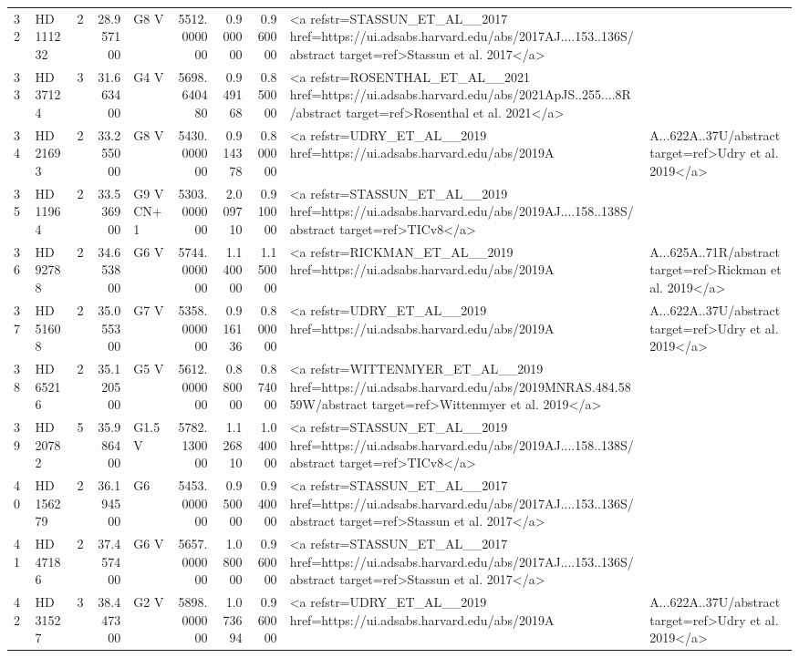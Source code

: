 \begin{tabular}{llrrlrrrl}
32 & HD 111232 & 2 & 28.957100 & G8 V & 5512.000000 & 0.900000 & 0.960000 & <a refstr=STASSUN_ET_AL__2017 href=https://ui.adsabs.harvard.edu/abs/2017AJ....153..136S/abstract target=ref>Stassun et al. 2017</a> \\
33 & HD 37124 & 3 & 31.663400 & G4 V & 5698.640480 & 0.949168 & 0.850000 & <a refstr=ROSENTHAL_ET_AL__2021 href=https://ui.adsabs.harvard.edu/abs/2021ApJS..255....8R/abstract target=ref>Rosenthal et al. 2021</a> \\
34 & HD 21693 & 2 & 33.255000 & G8 V & 5430.000000 & 0.914378 & 0.800000 & <a refstr=UDRY_ET_AL__2019 href=https://ui.adsabs.harvard.edu/abs/2019A&A...622A..37U/abstract target=ref>Udry et al. 2019</a> \\
35 & HD 11964 & 2 & 33.536900 & G9 V CN+1 & 5303.000000 & 2.009710 & 0.910000 & <a refstr=STASSUN_ET_AL__2019 href=https://ui.adsabs.harvard.edu/abs/2019AJ....158..138S/abstract target=ref>TICv8</a> \\
36 & HD 92788 & 2 & 34.653800 & G6 V & 5744.000000 & 1.140000 & 1.150000 & <a refstr=RICKMAN_ET_AL__2019 href=https://ui.adsabs.harvard.edu/abs/2019A&A...625A..71R/abstract target=ref>Rickman et al. 2019</a> \\
37 & HD 51608 & 2 & 35.055300 & G7 V & 5358.000000 & 0.916136 & 0.800000 & <a refstr=UDRY_ET_AL__2019 href=https://ui.adsabs.harvard.edu/abs/2019A&A...622A..37U/abstract target=ref>Udry et al. 2019</a> \\
38 & HD 65216 & 2 & 35.120500 & G5 V & 5612.000000 & 0.880000 & 0.874000 & <a refstr=WITTENMYER_ET_AL__2019 href=https://ui.adsabs.harvard.edu/abs/2019MNRAS.484.5859W/abstract target=ref>Wittenmyer et al. 2019</a> \\
39 & HD 20782 & 5 & 35.986400 & G1.5 V & 5782.130000 & 1.126810 & 1.040000 & <a refstr=STASSUN_ET_AL__2019 href=https://ui.adsabs.harvard.edu/abs/2019AJ....158..138S/abstract target=ref>TICv8</a> \\
40 & HD 156279 & 2 & 36.194500 & G6 & 5453.000000 & 0.950000 & 0.940000 & <a refstr=STASSUN_ET_AL__2017 href=https://ui.adsabs.harvard.edu/abs/2017AJ....153..136S/abstract target=ref>Stassun et al. 2017</a> \\
41 & HD 47186 & 2 & 37.457400 & G6 V & 5657.000000 & 1.080000 & 0.960000 & <a refstr=STASSUN_ET_AL__2017 href=https://ui.adsabs.harvard.edu/abs/2017AJ....153..136S/abstract target=ref>Stassun et al. 2017</a> \\
42 & HD 31527 & 3 & 38.447300 & G2 V & 5898.000000 & 1.073694 & 0.960000 & <a refstr=UDRY_ET_AL__2019 href=https://ui.adsabs.harvard.edu/abs/2019A&A...622A..37U/abstract target=ref>Udry et al. 2019</a> \\

\end{tabular}
